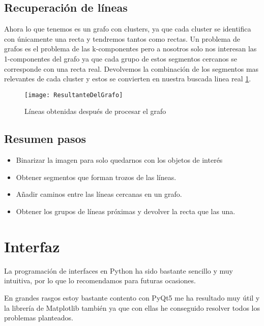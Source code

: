 \subsection{Recuperación de líneas}
Ahora lo que tenemos es un grafo con clusters, ya que cada cluster se identifica con únicamente una recta y tendremos tantos como rectas.
Un problema de grafos es el problema de las k-componentes pero a nosotros solo nos interesan las 1-componentes del grafo ya que cada grupo de estos segmentos cercanos se corresponde con una recta real.
Devolvemos la combinación de los segmentos mas relevantes de cada cluster y estos se convierten en nuestra buscada linea real \ref{fig:5.7}.
\begin{figure}[h]
\centering
\texttt{[image: ResultanteDelGrafo]}
\caption{Líneas obtenidas después de procesar el grafo}
\label{fig:5.7}
\end{figure}

\subsection{Resumen pasos}

\begin{itemize}
\item Binarizar la imagen para solo quedarnos con los objetos de interés
\item Obtener segmentos que forman trozos de las líneas.
\item Añadir caminos entre las líneas cercanas en un grafo.
\item Obtener los grupos de líneas próximas y devolver la recta que las una. 
\end{itemize}

\section{Interfaz}
La programación de interfaces en Python ha sido bastante sencillo y muy intuitiva, por lo que lo recomendamos para futuras ocasiones.

En grandes rasgos estoy bastante contento con PyQt5 me ha resultado muy útil y la librería de Matplotlib también ya que con ellas he conseguido resolver todos los problemas planteados.


